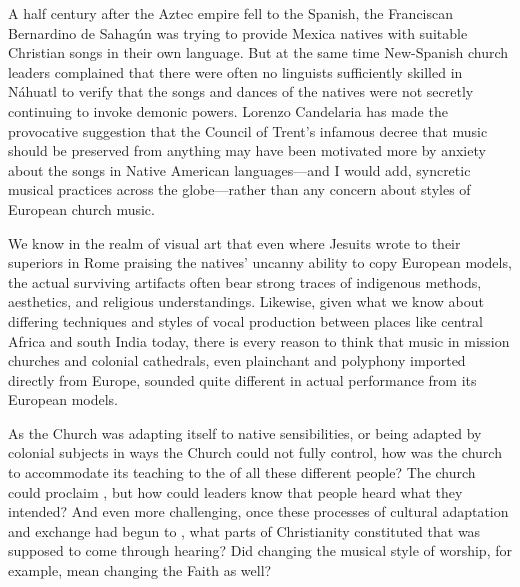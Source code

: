 A half century after the Aztec empire fell to the Spanish, the Franciscan Bernardino de Sahagún was trying to provide Mexica natives with suitable Christian songs in their own language.%
    \Autocite{Candelaria:Psalmodia}
But at the same time New-Spanish church leaders complained that there were often no linguists sufficiently skilled in Náhuatl to verify that the songs and dances of the natives were not secretly continuing to invoke demonic powers.%
    \Autocite[637]{Candelaria:Psalmodia}
Lorenzo Candelaria has made the provocative suggestion that the Council of Trent's infamous decree that music should be preserved from anything  may have been motivated more by anxiety about the songs in Native American languages---and I would add, syncretic musical practices across the globe---rather than any concern about styles of European church music.%
    \Autocite[637--638]{Candelaria:Psalmodia} %

We know in the realm of visual art that even where Jesuits wrote to their superiors in Rome praising the natives' uncanny ability to copy European models, the actual surviving artifacts often bear strong traces of indigenous methods, aesthetics, and religious understandings.%
    \Autocites[27--29, 34]{Bailey:Art}
Likewise, given what we know about differing techniques and styles of vocal production between places like central Africa and south India today, there is every reason to think that music in mission churches and colonial cathedrals, even plainchant and polyphony imported directly from Europe, sounded quite different in actual performance from its European models.

As the Church was adapting itself to native sensibilities, or being adapted by colonial subjects in ways the Church could not fully control, how was the church to accommodate its teaching to the  of all these different people?
The church could proclaim , but how could leaders know that people heard what they intended?
And even more challenging, once these processes of cultural adaptation and exchange had begun to , what parts of Christianity constituted  that was supposed to come through hearing?
Did changing the musical style of worship, for example, mean changing the Faith as well?

